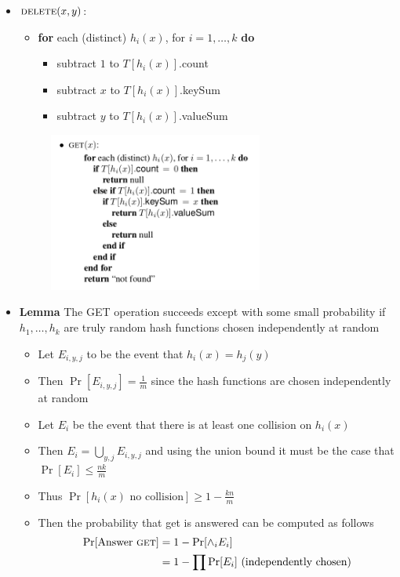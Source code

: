 \begin{itemize}
  \item $\textsc{delete}(x,y)$:
  \begin{itemize}
    \item \textbf{for} each (distinct) $h_i(x)$, for $i=1, \dots, k$ \textbf{do}
    \begin{itemize}
      \item subtract $1$ to $T[h_i(x)]$.count
      \item subtract $x$ to $T[h_i(x)]$.keySum
      \item subtract $y$ to $T[h_i(x)]$.valueSum
    \end{itemize}
  \end{itemize}
  \begin{figure}[H]
  	\includegraphics[width=200pt]{img/get}
  \end{figure}
  \item \textbf{Lemma} The GET operation succeeds except with some small probability if $h_1, \dots, h_k$ are truly random hash functions chosen independently at random
  \begin{itemize}
  	\item Let $E_{i,y,j}$ to be the event that $h_i(x) = h_j(y)$
    \item Then $\Pr[E_{i,y,j}] = \frac1m$ since the hash functions are chosen independently at random
    \item Let $E_i$ be the event that there is at least one collision on $h_i(x)$
    \item Then $E_i = \bigcup_{y,j} E_{i,y,j}$ and using the union bound it must be the case that $\Pr[E_i] \leq \frac{nk}m$ 
    \item Thus $\Pr[h_i(x) \text{ no collision}] \geq 1 - \frac{kn}m$
    \item Then the probability that get is answered can be computed as follows
    \begin{align*}
      \Pr[\text{Answer } \textsc{get}] &= 1- \Pr[\land_{i}E_i] \\
                                       &= 1- \prod \Pr[E_i] \text{ (independently chosen)} \\

\end{align*}
\end{itemize}
\end{itemize}
